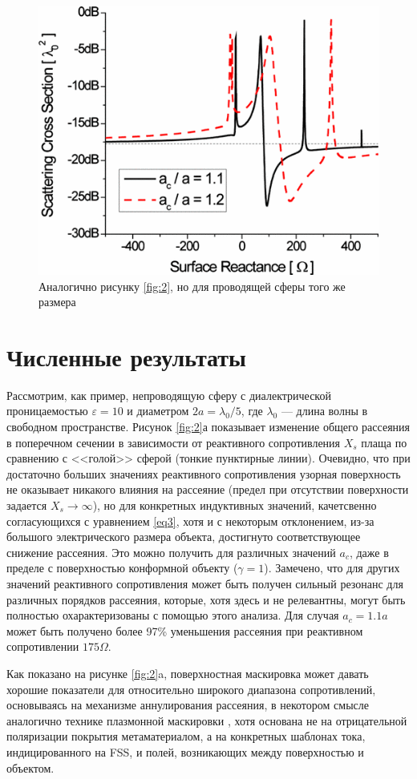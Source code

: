\documentclass[12pt,a4paper]{article}
\begin{document}
\begin{figure}[t]
  \centering
  \includegraphics[height=0.3\paperheight, width=0.6\paperwidth]{4.png}
  \caption{Аналогично рисунку \ref{fig:2}, но для проводящей сферы того же размера}
  \label{fig:4}
\end{figure}

\section{Численные результаты}
Рассмотрим, как пример, непроводящую сферу с диалектрической проницаемостью $\varepsilon=10$ 
и диаметром $2a=\lambda_0/5$, где $\lambda_0$ --- длина волны в свободном пространстве. 
Рисунок \ref{fig:2}а показывает изменение общего рассеяния в поперечном сечении в 
зависимости от реактивного сопротивления $X_s$ плаща по сравнению с <<голой>> сферой
(тонкие пунктирные линии). Очевидно, что при достаточно больших значениях реактивного 
сопротивления узорная поверхность не оказывает никакого влияния на рассеяние (предел при
отсутствии поверхности задается $X_s \to \infty$), но для конкретных индуктивных значений,
качетсвенно согласующихся с уравнением \ref{eq3}, хотя и с некоторым отклонением, из-за
большого электрического размера объекта, достигнуто соответствующее снижение рассеяния.
Это можно получить для различных значений $a_c$, даже в пределе с поверхностью конформной
объекту ($\gamma=1$). Замечено, что для других значений реактивного сопротивления может
быть получен сильный резонанс для различных порядков рассеяния, которые, хотя здесь и не
релевантны, могут быть полностью охарактеризованы с помощью этого анализа. Для случая
$a_c=1.1a$ может быть получено более 97\% уменьшения рассеяния при реактивном сопротивлении
$175\Omega$.

Как показано на рисунке \ref{fig:2}a, поверхностная маскировка может давать хорошие 
показатели для относительно широкого диапазона сопротивлений, основываясь на механизме
аннулирования рассеяния, в некотором смысле аналогично технике плазмонной маскировки 
\cite{8}, хотя основана не на отрицательной поляризации покрытия метаматериалом, а на
конкретных шаблонах тока, индицированного на FSS, и полей, возникающих между поверхностью и
объектом.
\end{document}
